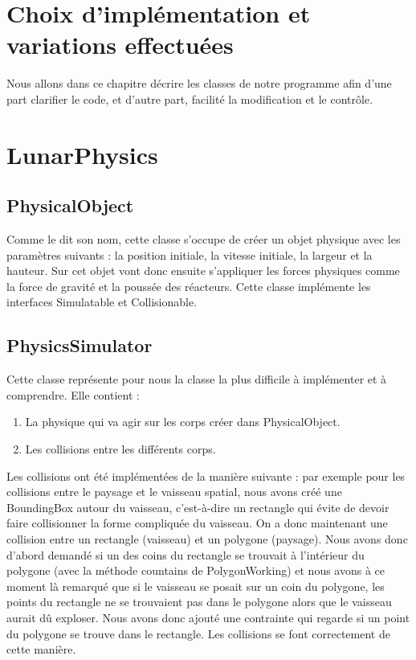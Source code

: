 \section{Choix d'implémentation et variations effectuées}
Nous allons dans ce chapitre décrire les classes de notre programme afin d’une part clarifier le code, et d’autre part, facilité la modification et le contrôle.
\section{LunarPhysics}

\subsection{PhysicalObject}
Comme le dit son nom, cette classe s’occupe de créer un objet physique avec les paramètres suivants : la position initiale, la vitesse initiale, la largeur et la hauteur. Sur cet objet vont donc ensuite s’appliquer les forces physiques comme la force de gravité et la poussée des réacteurs. Cette classe implémente les interfaces Simulatable et Collisionable.

\subsection{PhysicsSimulator}
Cette classe représente pour nous la classe la plus difficile à implémenter et à comprendre. Elle contient :

\begin{enumerate}
\item La physique qui va agir sur les corps créer dans PhysicalObject.
\item Les collisions entre les différents corps.
\end{enumerate}

Les collisions ont été implémentées de la manière suivante : par exemple pour les collisions entre le paysage et le vaisseau spatial, nous avons créé une BoundingBox autour du vaisseau, c’est-à-dire un rectangle qui évite de devoir faire collisionner la forme compliquée du vaisseau. On a donc maintenant une collision entre un rectangle (vaisseau) et un polygone (paysage). Nous avons donc d’abord demandé si un des coins du rectangle se trouvait à l’intérieur du polygone (avec la méthode countains de PolygonWorking) et nous avons à ce moment là remarqué que si le vaisseau se posait sur un coin du polygone, les points du rectangle ne se trouvaient pas dans le polygone alors que le vaisseau aurait dû exploser. Nous avons donc ajouté une contrainte qui regarde si un point du polygone se trouve dans le rectangle. Les collisions se font correctement de cette manière.

